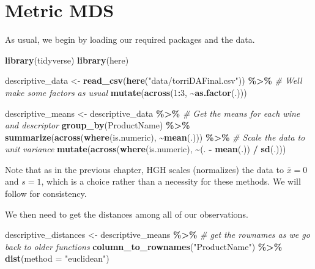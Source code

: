 \documentclass[
]{book}
\newenvironment{Shaded}{\begin{snugshade}}{\end{snugshade}}
\newcommand{\AttributeTok}[1]{\textcolor[rgb]{0.13,0.29,0.53}{#1}}
\newcommand{\CommentTok}[1]{\textcolor[rgb]{0.56,0.35,0.01}{\textit{#1}}}
\newcommand{\DecValTok}[1]{\textcolor[rgb]{0.00,0.00,0.81}{#1}}
\newcommand{\FunctionTok}[1]{\textcolor[rgb]{0.13,0.29,0.53}{\textbf{#1}}}
\newcommand{\NormalTok}[1]{#1}
\newcommand{\OtherTok}[1]{\textcolor[rgb]{0.56,0.35,0.01}{#1}}
\newcommand{\SpecialCharTok}[1]{\textcolor[rgb]{0.81,0.36,0.00}{\textbf{#1}}}
\newcommand{\StringTok}[1]{\textcolor[rgb]{0.31,0.60,0.02}{#1}}
\begin{document}
\section{Metric MDS}\label{metric-mds}

As usual, we begin by loading our required packages and the data.

\begin{Shaded}
\begin{Highlighting}[]
\FunctionTok{library}\NormalTok{(tidyverse)}
\FunctionTok{library}\NormalTok{(here)}

\NormalTok{descriptive\_data }\OtherTok{\textless{}{-}} 
  \FunctionTok{read\_csv}\NormalTok{(}\FunctionTok{here}\NormalTok{(}\StringTok{"data/torriDAFinal.csv"}\NormalTok{)) }\SpecialCharTok{\%\textgreater{}\%}
  \CommentTok{\# We\textquotesingle{}ll make some factors as usual}
  \FunctionTok{mutate}\NormalTok{(}\FunctionTok{across}\NormalTok{(}\DecValTok{1}\SpecialCharTok{:}\DecValTok{3}\NormalTok{, }\SpecialCharTok{\textasciitilde{}}\FunctionTok{as.factor}\NormalTok{(.)))}

\NormalTok{descriptive\_means }\OtherTok{\textless{}{-}} 
\NormalTok{  descriptive\_data }\SpecialCharTok{\%\textgreater{}\%}
  \CommentTok{\# Get the means for each wine and descriptor}
  \FunctionTok{group\_by}\NormalTok{(ProductName) }\SpecialCharTok{\%\textgreater{}\%}
  \FunctionTok{summarize}\NormalTok{(}\FunctionTok{across}\NormalTok{(}\FunctionTok{where}\NormalTok{(is.numeric), }\SpecialCharTok{\textasciitilde{}}\FunctionTok{mean}\NormalTok{(.))) }\SpecialCharTok{\%\textgreater{}\%}
  \CommentTok{\# Scale the data to unit variance}
  \FunctionTok{mutate}\NormalTok{(}\FunctionTok{across}\NormalTok{(}\FunctionTok{where}\NormalTok{(is.numeric), }\SpecialCharTok{\textasciitilde{}}\NormalTok{(. }\SpecialCharTok{{-}} \FunctionTok{mean}\NormalTok{(.)) }\SpecialCharTok{/} \FunctionTok{sd}\NormalTok{(.)))}
\end{Highlighting}
\end{Shaded}

Note that as in the previous chapter, HGH scales (normalizes) the data to \(\bar{x}=0\) and \(s=1\), which is a choice rather than a necessity for these methods. We will follow for consistency.

We then need to get the distances among all of our observations.

\begin{Shaded}
\begin{Highlighting}[]
\NormalTok{descriptive\_distances }\OtherTok{\textless{}{-}} 
\NormalTok{  descriptive\_means }\SpecialCharTok{\%\textgreater{}\%}
  \CommentTok{\# get the rownames as we go back to older functions }
  \FunctionTok{column\_to\_rownames}\NormalTok{(}\StringTok{"ProductName"}\NormalTok{) }\SpecialCharTok{\%\textgreater{}\%}
  \FunctionTok{dist}\NormalTok{(}\AttributeTok{method =} \StringTok{"euclidean"}\NormalTok{)}
\end{Highlighting}
\end{Shaded}
\end{document}
